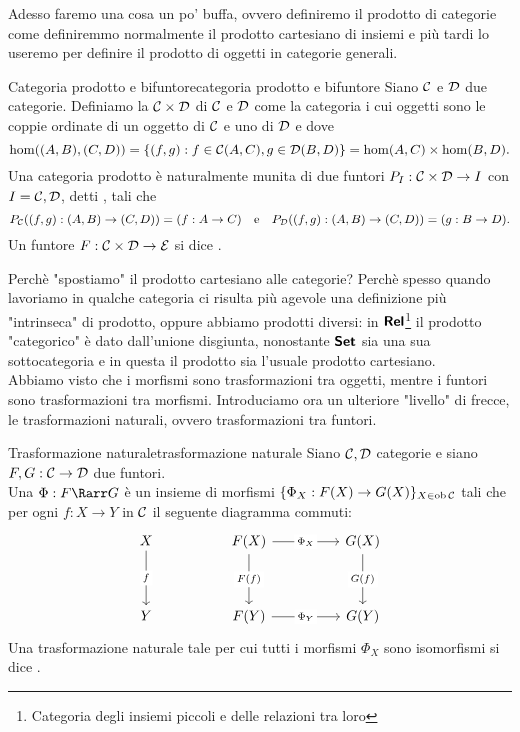 \documentclass{article}
\renewcommand\C{\mc{C}}
\newcommand\D{\mc{D}}
\begin{document}
Adesso faremo una cosa un po' buffa, ovvero definiremo il prodotto di categorie come definiremmo normalmente il prodotto cartesiano di insiemi e più tardi lo useremo per definire il prodotto di oggetti in categorie generali.

\begin{definition}{Categoria prodotto e bifuntore}{categoria prodotto e bifuntore}
    Siano $\C$ e $\D$ due categorie. Definiamo la  $\C\times\D$ di $\C$ e $\D$ come la categoria i cui oggetti sono le coppie ordinate di un oggetto di $\C$ e uno di $\D$ e dove
    \[ \hom((A,B),(C,D)) = \left\{ (f,g) : f \in \C(A,C), g \in \D(B,D) \right\} = \hom(A,C)\times \hom(B,D). \]
    Una categoria prodotto è naturalmente munita di due funtori $P_I : \C\times\D\to I$ con $I = \C,\D$, detti , tali che
    \[ P_\C ((f,g):(A,B)\to(C,D)) = (f:A\to C) \quad\text{e}\quad P_\D ((f,g):(A,B)\to(C,D)) = (g:B\to D).\]
    Un funtore $F:\C\times\D\to \mc{E}$ si dice .
\end{definition}

Perchè "spostiamo" il prodotto cartesiano alle categorie? Perchè spesso quando lavoriamo in qualche categoria ci risulta più agevole una definizione più "intrinseca" di prodotto, oppure abbiamo prodotti diversi: in $\text{\sffamily\textbf{Rel}}$\footnote{Categoria degli insiemi piccoli e delle relazioni tra loro} il prodotto "categorico" è dato dall'unione disgiunta, nonostante $\text{\sffamily\textbf{Set}}$ sia una sua sottocategoria e in questa il prodotto sia l'usuale prodotto cartesiano.\\
Abbiamo visto che i morfismi sono trasformazioni tra oggetti, mentre i funtori sono trasformazioni tra morfismi. Introduciamo ora un ulteriore "livello" di frecce, le trasformazioni naturali, ovvero trasformazioni tra funtori.

\begin{definition}{Trasformazione naturale}{trasformazione naturale}
    Siano $\C,\D$ categorie e siano $F,G : \C\to\D $ due funtori.\\
    Una  $\Phi:F\Rarr G$ è un insieme di morfismi $\{\Phi_X : F(X)\to G(X)\}_{X\in\ob\C}$ tali che per ogni $f:X\to Y$ in $\C$ il seguente diagramma commuti:
    \[\begin{tikzcd}
    	X && {F(X)} && {G(X)} \\
    	\\
    	Y && {F(Y)} && {G(Y)}
    	\arrow["f"{description}, from=1-1, to=3-1]
    	\arrow["{\Phi_X}"{description}, from=1-3, to=1-5]
    	\arrow["{F(f)}"{description}, from=1-3, to=3-3]
    	\arrow["{G(f)}"{description}, from=1-5, to=3-5]
	    \arrow["{\Phi_Y}"{description}, from=3-3, to=3-5]
    \end{tikzcd}\]
    Una trasformazione naturale tale per cui tutti i morfismi $\Phi_X$ sono isomorfismi si dice .
\end{definition}
\end{document}
